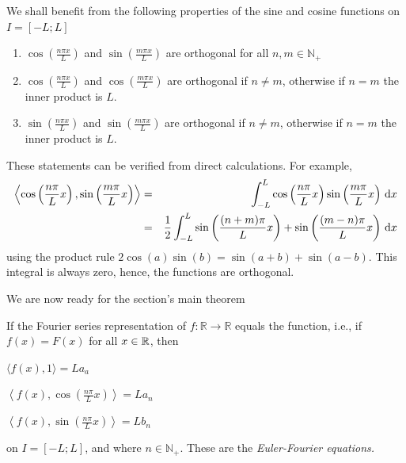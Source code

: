 We shall benefit from the following properties of the sine and cosine functions on
$I=[-L;L]$ 
\begin{enumerate}
	\item $\cos\left(\frac{n\pi x}{L}\right)$ and  
		$\sin\left(\frac{m\pi x}{L}\right)$ are orthogonal for all $n,m
		\in \mathbb{N}_ +$
	\item  $\cos\left(\frac{n\pi x}{L}\right)$ and  
		$\cos\left(\frac{m\pi x}{L}\right)$ are orthogonal if $n \neq
		m$, otherwise if $n=m$ the inner product is $L$.
	\item  $\sin\left(\frac{n\pi x}{L}\right)$ and  $\sin\left(\frac{m\pi
		x}{L}\right)$ are orthogonal if $n \neq
		m$, otherwise if $n=m$ the inner product is $L$.
\end{enumerate}
These statements can be verified from direct calculations. For example, 
\begin{eqnarray}
	\left \langle \cos\left(\frac{n\pi }{L}x\right), \sin\left(\frac{m\pi
	}{L}x\right) \right \rangle &=&  \int_{-L}^L \cos\left(\frac{n\pi}{L}x\right) \sin\left(\frac{m\pi
	}{L}x\right) \, \mathrm{d} x
	\nonumber \\
	&=& \frac{1}{2} \int_{-L}^L
	\sin\left(\frac{(n+m)\pi}{L}x\right)+\sin\left(\frac{(m-n)\pi}{L}x\right) \, \mathrm{d} x 
	\nonumber \\
\end{eqnarray}
using the product rule $2\cos(a)\sin(b) = \sin(a+b) + \sin(a-b)$. This integral is
always zero, hence, the functions are orthogonal. 

We are now ready for the section's main theorem
\begin{theorem}
	If the Fourier series representation of $f:\mathbb{R} \rightarrow \mathbb{R}$ 
	equals the function, i.e., if $f(x)=F(x)$ for all $x \in \mathbb{R}$, then
	\begin{description}[style=unboxed,leftmargin=0.5cm]
		\item[1] $\langle f(x), 1 \rangle = La_a$
		\item[2] $\left \langle f(x), \cos\left(\frac{n \pi}{L}x\right)
			\right\rangle = L a_n$
		\item[3] $\left \langle f(x), \sin\left(\frac{n \pi}{L}x\right)
			\right\rangle = L b_n$
	\end{description}	
	on $I=[-L; L]$, and where $n\in\mathbb{N}_+$. These are the \emph{Euler-Fourier
	equations.}  
\end{theorem}

